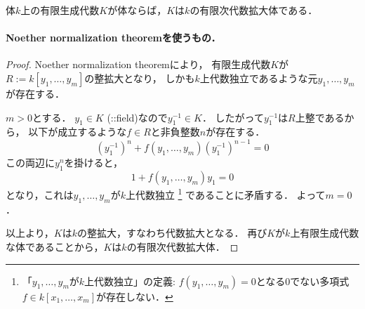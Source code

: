 
\begin{Lemma}
体$k$上の有限生成代数$K$が体ならば，$K$は$k$の有限次代数拡大体である．
\end{Lemma}

\paragraph{Noether normalization theoremを使うもの．}
\begin{proof}
    Noether normalization theoremにより，
    有限生成代数$K$が$R:=k[y_1, \dots, y_m]$の整拡大となり，
    しかも$k$上代数独立であるような元$y_1, \dots, y_m$が存在する．
    
    $m>0$とする．
    $y_1 \in K$ (::field)なので$y_1^{-1} \in K$．
    したがって$y_1^{-1}$は$R$上整であるから，
    以下が成立するような$f \in R$と非負整数$n$が存在する．
    \[ (y_1^{-1})^n+f(y_1, \dots, y_m) (y_1^{-1})^{n-1}=0 \]
    この両辺に$y_1^{n}$を掛けると，
    \[ 1+f(y_1, \dots, y_m) y_1=0 \]
    となり，これは$y_1, \dots, y_m$が$k$上代数独立
    \footnote
    {
        「$y_1, \dots, y_m$が$k$上代数独立」の定義:
        $f(y_1, \dots, y_m)=0$となる0でない多項式$f \in k[x_1, \dots, x_m]$が存在しない．
    } 
    であることに矛盾する．
    よって$m=0$．

    以上より，$K$は$k$の整拡大，すなわち代数拡大となる．
    再び$K$が$k$上有限生成代数な体であることから，$K$は$k$の有限次代数拡大体．
\end{proof}

